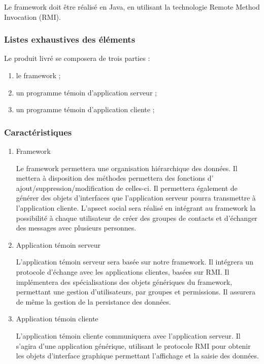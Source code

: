 Le framework doit être réalisé en Java, en utilisant la technologie Remote Method Invocation (RMI).

\subsubsection{Listes exhaustives des éléments} 
Le produit livré se composera de trois parties :
\begin{enumerate}
 \item le framework ;
 \item un programme témoin d'application serveur ;
 \item un programme témoin d'application cliente ;
\end{enumerate}

\subsubsection{Caractéristiques}
\begin{enumerate}
 \item Framework

Le framework permettera une organisation hiérarchique des données.
Il mettera à disposition des méthodes permettera des fonctions d' ajout/suppression/modification de celles-ci.
Il permettera également de générer des objets d'interfaces que l'application serveur pourra transmettre à l'application cliente.
L'apsect social sera réalisé en intégrant au framework la possibilité à chaque utilisateur de créer des groupes de contacts et d'échanger des messages avec plusieurs personnes.

 \item Application témoin serveur

L'application témoin serveur sera basée sur notre framework.
Il intégrera un protocole d'échange avec les applications clientes, basées sur RMI.
Il implémentera des spécialisations des objets génériques du framework, permettant une gestion d'utilisateurs, par groupes et permissions.
Il assurera de même la gestion de la persistance des données.

 \item Application témoin cliente

L'application témoin cliente communiquera avec l'application serveur.
Il s'agira d'une application générique, utilisant le protocole RMI pour obtenir les objets
d'interface graphique permettant l'affichage et la saisie des données.
\end{enumerate}
